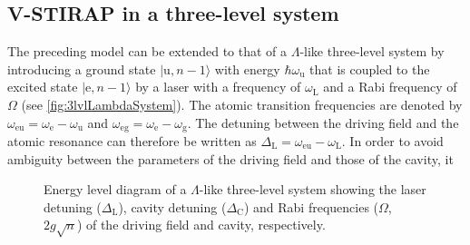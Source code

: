 \documentclass[../Thesis-IJspeert.tex]{subfiles}
\begin{document}
\subsection{V-STIRAP in a three-level system}
\label{vstirap}
The preceding model can be extended to that of a $\Lambda$-like three-level system by introducing a ground state $\vert \mathrm{u}, n-1 \rangle$ with energy $\hbar \omega_\mathrm{u}$ that is coupled to the excited state $\vert \mathrm{e}, n-1 \rangle $ by a laser with a frequency of $\omega_\mathrm{L}$ and a Rabi frequency of $\Omega$ (see \autoref{fig:3lvlLambdaSystem}). The atomic transition frequencies are denoted by $\omega_\mathrm{eu}=\omega_\mathrm{e}-\omega_\mathrm{u}$ and $\omega_\mathrm{eg}=\omega_\mathrm{e}-\omega_\mathrm{g}$. The detuning between the driving field and the atomic resonance can therefore be written as $\Delta_\mathrm{L}=\omega_\mathrm{eu}-\omega_\mathrm{L}$. In order to avoid ambiguity between the parameters of the driving field and those of the cavity, it
\begin{figure}
	\centering
	\vspace{0.5em}
	\caption[Energy level diagram of a $\Lambda$-like three-level system]{Energy level diagram of a $\Lambda$-like three-level system showing the laser detuning ($\Delta_\mathrm{L}$), cavity detuning ($\Delta_\mathrm{C}$) and Rabi frequencies ($\Omega$, $2g\sqrt{n}$) of the driving field and cavity, respectively.}
	\label{fig:3lvlLambdaSystem}
\end{figure}
\end{document}
